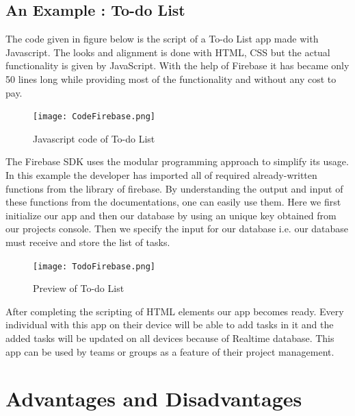 \documentclass[12pt,a4paper]{report}
\begin{document}
\section{{\fontsize{16}{0}\selectfont An Example : To-do List}}
{\fontsize{14}{0}\selectfont
\noindent
The code given in figure below is the script of a To-do List app made with Javascript. The looks and alignment is done with \ac{HTML}, \ac{CSS} but the actual functionality is given by JavaScript. With the help of Firebase it has became only 50 lines long while providing most of the functionality and without any cost to pay.
\vspace{1cm}
\begin{figure}[ht]
    \centering
    \texttt{[image: CodeFirebase.png]}
    \caption{\fontsize{12}{0}\selectfont Javascript code of To-do List}
    \label{fig:Javascriptcode}
\end{figure}

\hspace{1cm}The Firebase \ac{SDK} uses the modular programming approach to simplify its usage. In this example the developer has imported all of required already-written functions from the library of firebase. By understanding the output and input of these functions from the documentations, one can easily use them. Here we first initialize our app and then our database by using an unique key obtained from our projects console. Then we specify the input for our database i.e. our database must receive and store the list of tasks. 
\vspace{1cm}
\begin{figure}[ht]
    \centering
    \texttt{[image: TodoFirebase.png]}
    \caption{\fontsize{12}{0}\selectfont Preview of To-do List}
    \label{fig:TodoList}
\end{figure}

\hspace{1cm} After completing the scripting of \ac{HTML} elements our app becomes ready. Every individual with this app on their device will be able to add tasks in it and the added tasks will be updated on all devices because of Realtime database. This app can be used by teams or groups as a feature of their project management.
 }

\chapter{\fontsize{18}{0}\selectfont Advantages and Disadvantages }
\end{document}

